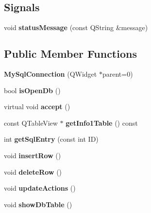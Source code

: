 \subsection*{Signals}
\begin{DoxyCompactItemize}
\item 
\hypertarget{classMySqlConnection_a9e602191b2e8d9e71d13dc6d22ca7077}{void {\bfseries status\-Message} (const Q\-String \&message)}\label{classMySqlConnection_a9e602191b2e8d9e71d13dc6d22ca7077}

\end{DoxyCompactItemize}
\subsection*{Public Member Functions}
\begin{DoxyCompactItemize}
\item 
\hypertarget{classMySqlConnection_abe7a400c5461c21aca50489809670499}{{\bfseries My\-Sql\-Connection} (Q\-Widget $\ast$parent=0)}\label{classMySqlConnection_abe7a400c5461c21aca50489809670499}

\item 
\hypertarget{classMySqlConnection_a4157a2b1a13dd38235b8cf44edf33de4}{bool {\bfseries is\-Open\-Db} ()}\label{classMySqlConnection_a4157a2b1a13dd38235b8cf44edf33de4}

\item 
\hypertarget{classMySqlConnection_a075a149e340456a2abd75f920407c787}{virtual void {\bfseries accept} ()}\label{classMySqlConnection_a075a149e340456a2abd75f920407c787}

\item 
\hypertarget{classMySqlConnection_ac5f001e435068478a6cd8a50c70d6293}{const Q\-Table\-View $\ast$ {\bfseries get\-Info1\-Table} () const }\label{classMySqlConnection_ac5f001e435068478a6cd8a50c70d6293}

\item 
\hypertarget{classMySqlConnection_a4c46605e72ec9ab9ec2a1e600a7d7c83}{int {\bfseries get\-Sql\-Entry} (const int I\-D)}\label{classMySqlConnection_a4c46605e72ec9ab9ec2a1e600a7d7c83}

\item 
\hypertarget{classMySqlConnection_aef33072636f1d5fb293893314834027b}{void {\bfseries insert\-Row} ()}\label{classMySqlConnection_aef33072636f1d5fb293893314834027b}

\item 
\hypertarget{classMySqlConnection_a718042d2bd4ebaacc0a1636abeb67cf4}{void {\bfseries delete\-Row} ()}\label{classMySqlConnection_a718042d2bd4ebaacc0a1636abeb67cf4}

\item 
\hypertarget{classMySqlConnection_a3e05b557783c28488a3ad701c5826b50}{void {\bfseries update\-Actions} ()}\label{classMySqlConnection_a3e05b557783c28488a3ad701c5826b50}

\item 
\hypertarget{classMySqlConnection_a047c0631b88cf69f20368901e34c0764}{void {\bfseries show\-Db\-Table} ()}\label{classMySqlConnection_a047c0631b88cf69f20368901e34c0764}

\end{DoxyCompactItemize}
